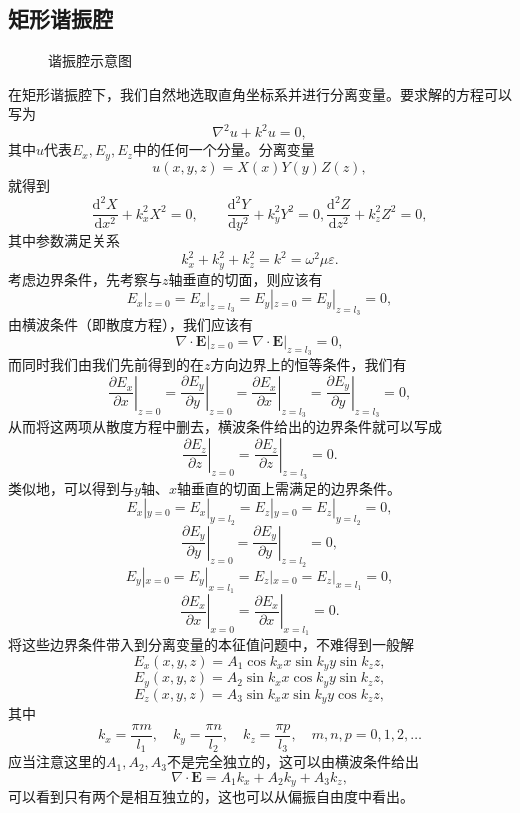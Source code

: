 \documentclass[UTF8]{ctexbook}
\renewcommand{\d}{\mathrm{d}}
\renewcommand{\b}{\boldsymbol}
\numberwithin{equation}{chapter}
\begin{document}
	\subsection{矩形谐振腔}
	\begin{figure}[H]
		\centering
		\caption{谐振腔示意图}
	\end{figure}
	在矩形谐振腔下，我们自然地选取直角坐标系并进行分离变量。要求解的方程可以写为
	\[\nabla^2 u+k^2u=0,\]
	其中$u$代表$E_x,E_y,E_z$中的任何一个分量。分离变量
	\[u(x,y,z)=X(x)Y(y)Z(z),\]
	就得到
	\[\frac{\d^2 X}{\d x^2}+k_x^2X^2=0,\quad \quad \frac{\d^2 Y}{\d y^2}+k_y^2Y^2=0,\frac{\d^2 Z}{\d z^2}+k_z^2Z^2=0,\]
	其中参数满足关系
	\[k_x^2+k_y^2+k_z^2=k^2=\omega^2\mu\varepsilon.\]
	考虑边界条件，先考察与$z$轴垂直的切面，则应该有
	\[E_x|_{z=0}=E_x|_{z=l_3}=E_y|_{z=0}=E_y|_{z=l_3}=0,\]
	由横波条件（即散度方程），我们应该有
	\[\nabla\cdot\b{E}|_{z=0}=\nabla\cdot\b{E}|_{z=l_3}=0,\]
	而同时我们由我们先前得到的在$z$方向边界上的恒等条件，我们有
	\[\left.\frac{\partial E_x}{\partial x}\right|_{z=0}=\left.\frac{\partial E_y}{\partial y}\right|_{z=0}=\left.\frac{\partial E_x}{\partial x}\right|_{z=l_3}=\left.\frac{\partial E_y}{\partial y}\right|_{z=l_3}=0,\]
	从而将这两项从散度方程中删去，横波条件给出的边界条件就可以写成
	\[\left.\frac{\partial E_z}{\partial z}\right|_{z=0}=\left.\frac{\partial E_z}{\partial z}\right|_{z=l_3}=0.\]
	类似地，可以得到与$y$轴、$x$轴垂直的切面上需满足的边界条件。
	\[E_x|_{y=0}=E_x|_{y=l_2}=E_z|_{y=0}=E_z|_{y=l_2}=0,\]
	\[\left.\frac{\partial E_y}{\partial y}\right|_{z=0}=\left.\frac{\partial E_y}{\partial y}\right|_{z=l_2}=0,\]
	\[E_y|_{x=0}=E_y|_{x=l_1}=E_z|_{x=0}=E_z|_{x=l_1}=0,\]
	\[\left.\frac{\partial E_x}{\partial x}\right|_{x=0}=\left.\frac{\partial E_x}{\partial x}\right|_{x=l_1}=0.\]
	将这些边界条件带入到分离变量的本征值问题中，不难得到一般解
	\[E_x(x,y,z)=A_1\cos k_xx\sin k_yy\sin k_zz,\]
	\[E_y(x,y,z)=A_2\sin k_xx\cos k_yy\sin k_zz,\]
	\[E_z(x,y,z)=A_3\sin k_xx\sin k_yy\cos k_zz,\]
	其中
	\[k_x=\frac{\pi m}{l_1},\quad k_y=\frac{\pi n}{l_2},\quad k_z=\frac{\pi p}{l_3},\quad m,n,p = 0,1,2,\dots\]
	应当注意这里的$A_1,A_2,A_3$不是完全独立的，这可以由横波条件给出
	\[\nabla\cdot\b{E}=A_1k_x+A_2k_y+A_3k_z,\]
	可以看到只有两个是相互独立的，这也可以从偏振自由度中看出。
	
\end{document}
